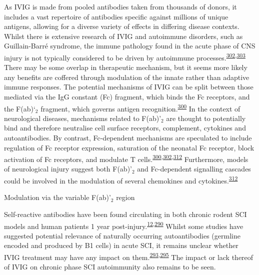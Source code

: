 \documentclass[
]{article}
\begin{document}
As IVIG is made from pooled antibodies taken from thousands of donors, it includes a vast repertoire of antibodies specific against millions of unique antigens, allowing for a diverse variety of effects in differing disease contexts.
Whilst there is extensive research of IVIG and autoimmune disorders, such as Guillain-Barré syndrome, the immune pathology found in the acute phase of CNS injury is not typically considered to be driven by autoimmune processes.\textsuperscript{\protect\hyperlink{ref-lunemann_intravenous_2015}{302},\protect\hyperlink{ref-stangel_intravenous_1998}{303}}
There may be some overlap in therapeutic mechanism, but it seems more likely any benefits are coffered through modulation of the innate rather than adaptive immune responses.
The potential mechanisms of IVIG can be split between those mediated via the IgG constant (Fc) fragment, which binds the Fc receptors, and the F(ab)`\(_2\) fragment, which governs antigen recognition.\textsuperscript{\protect\hyperlink{ref-schwab_intravenous_2013}{300}}
In the context of neurological diseases, mechanisms related to F(ab)'\(_2\) are thought to potentially bind and therefore neutralise cell surface receptors, complement, cytokines and autoantibodies.
By contrast, Fc-dependent mechanisms are speculated to include regulation of Fc receptor expression, saturation of the neonatal Fc receptor, block activation of Fc receptors, and modulate T cells.\textsuperscript{\protect\hyperlink{ref-schwab_intravenous_2013}{300},\protect\hyperlink{ref-lunemann_intravenous_2015}{302},\protect\hyperlink{ref-dalakas_mechanistic_2014}{312}}
Furthermore, models of neurological injury suggest both F(ab)'\(_2\) and Fc-dependent signalling cascades could be involved in the modulation of several chemokines and cytokines.\textsuperscript{\protect\hyperlink{ref-dalakas_mechanistic_2014}{312}}

Modulation via the variable F(ab)'\(_2\) region

Self-reactive antibodies have been found circulating in both chronic rodent SCI models and human patients 1 year post-injury.\textsuperscript{\protect\hyperlink{ref-hayes_elevated_2002}{12},\protect\hyperlink{ref-ankeny_b_2009}{290}}
Whilst some studies have suggested potential relevance of naturally occurring autoantibodies (germline encoded and produced by B1 cells) in acute SCI, it remains unclear whether IVIG treatment may have any impact on them.\textsuperscript{\protect\hyperlink{ref-palmers_antibody_2016}{293},\protect\hyperlink{ref-narang_natural_2017}{295}}
The impact or lack thereof of IVIG on chronic phase SCI autoimmunity also remains to be seen.
\end{document}
